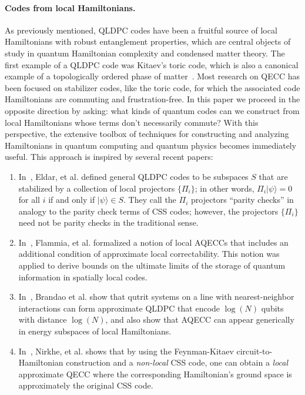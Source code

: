 \documentclass[11pt,letterpaper]{article}
\theoremstyle{definition}
\theoremstyle{remark}
\numberwithin{equation}{section}
\let\origparagraph\paragraph
\renewcommand{\paragraph}[1]{\origparagraph{#1.}}
\theoremstyle{definition}
\newcommand{\ket}[1]{|#1\rangle}
\begin{document}
\paragraph{Codes from local Hamiltonians} As previously mentioned, QLDPC codes have been a fruitful source of local Hamiltonians with robust entanglement properties, which are central objects of study in quantum Hamiltonian complexity and condensed matter theory.  The first example of a QLDPC code was Kitaev's toric code, which is also a canonical example of a topologically ordered phase of matter~\cite{kitaev2003fault}.  Most research on QECC has been focused on stabilizer codes, like the toric code, for which the associated code Hamiltonians are commuting and frustration-free. In this paper we proceed in the opposite direction by asking: what kinds of quantum codes can we construct from local Hamiltonians whose terms don't necessarily commute? With this perspective, the extensive toolbox of techniques for constructing and analyzing Hamiltonians in quantum computing and quantum physics becomes immediately useful. This approach is inspired by several recent papers:
\begin{enumerate}
  \item In~\cite{eldar2016need}, Eldar, et al. defined general QLDPC codes to be subspaces $S$ that are stabilized by a collection of local projectors $\{ \Pi_i \}$; in other words, $\Pi_i \ket{\psi} = 0$ for all $i$ if and only if $\ket{\psi} \in S$. They call the $\Pi_i$ projectors ``parity checks'' in analogy to the parity check terms of CSS codes; however, the projectors $\{\Pi_i \}$ need not be parity checks in the traditional sense.
  
  \item In~\cite{flammia2017limits}, Flammia, et al. formalized a notion of local AQECCs that includes an additional condition of approximate local correctability.  This notion was applied to derive bounds on the ultimate limits of the storage of quantum information in spatially local codes. %

\item In~\cite{brandao2017quantum}, Brandao et al. show that qutrit systems on a line with nearest-neighbor interactions can form approximate QLDPC that encode $\log(N)$ qubits with distance $\log(N)$, and also show that AQECC can appear generically in energy subspaces of local Hamiltonians.

  \item In~\cite{nirkhe_et_al:LIPIcs:2018:9095}, Nirkhe, et al. shows that by using the Feynman-Kitaev circuit-to-Hamiltonian construction and a \emph{non-local} CSS code, one can obtain a \emph{local} approximate QECC where the corresponding Hamiltonian's ground space is approximately the original CSS code. 
\end{enumerate}
\end{document}
